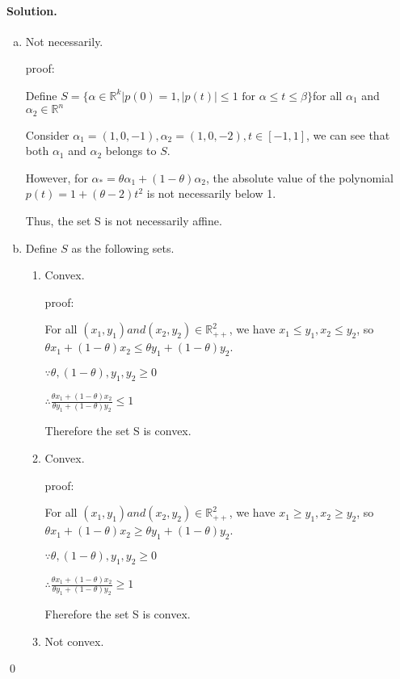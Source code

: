 \documentclass[a4paper]{article}
\newenvironment{solution}
{\color{blue} \paragraph{Solution.}}
{\newline \qed}
\begin{document}
\begin{solution}
    \begin{enumerate}[a)]
        \item Not necessarily.
        
        proof:

        Define $S=\{  \alpha \in \mathbb{R}^k | p(0)=1, |p(t)|\leq1 \text{ for } \alpha \leq t \leq \beta\}$for all $\alpha_1$ and $\alpha_2 \in \mathbb{R}^n$

        Consider $\alpha_1=(1, 0, -1), \alpha_2=(1, 0, -2), t\in [-1, 1]$, we can see that both $\alpha_1$ and $\alpha_2$ belongs to $S$.

        However, for $\alpha_*=\theta \alpha_1+(1-\theta)\alpha_2$, the absolute value of the polynomial $p(t)=1+(\theta-2)t^2$ is not necessarily below 1.

        Thus, the set S is not necessarily affine.
        
        \item Define $S$ as the following sets.
        \begin{enumerate}[1)]
            \item Convex. 

            proof: 
            
            For all $(x_1, y_1) and (x_2,y_2)\in \mathbb{R}_{++}^2$, we have $x_1\leq y_1, x_2\leq y_2$, so $\theta x_1+(1-\theta) x_2\leq \theta y_1+(1-\theta)y_2$. 

            $\because \theta, (1-\theta), y_1, y_2\geq 0$

            $\therefore \frac{\theta x_1+(1-\theta)x_2}{\theta y_1+(1-\theta)y_2}\leq 1$

            Therefore the set S is convex.

            \item Convex.
            
            proof:

            For all $(x_1, y_1) and (x_2,y_2)\in \mathbb{R}_{++}^2$, we have $x_1\geq y_1, x_2\geq y_2$, so $\theta x_1+(1-\theta) x_2\geq \theta y_1+(1-\theta)y_2$. 

            $\because \theta, (1-\theta), y_1, y_2\geq 0$

            $\therefore \frac{\theta x_1+(1-\theta)x_2}{\theta y_1+(1-\theta)y_2}\geq 1$

            Fherefore the set S is convex.

            \item Not convex.
            

\end{enumerate}
\end{enumerate}
\end{solution}
\end{document}
